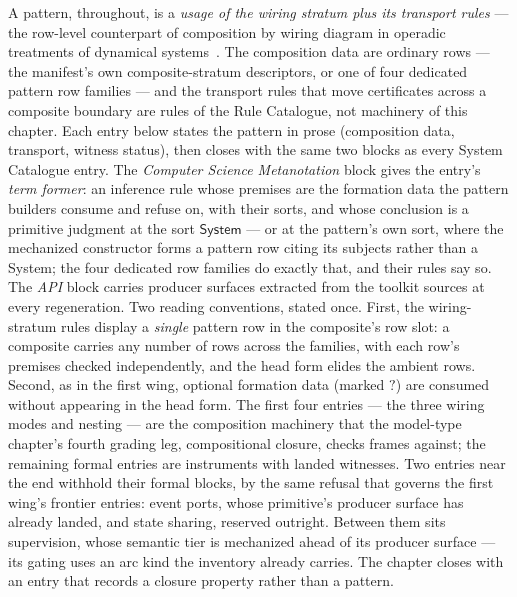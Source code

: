 A pattern, throughout, is a \emph{usage of the wiring stratum plus its
transport rules} --- the row-level counterpart of composition by
wiring diagram in operadic treatments of dynamical
systems~\cite{libkind21}. The composition data are ordinary rows --- the
manifest's own composite-stratum descriptors, or one of four dedicated
pattern row families --- and the transport rules that move
certificates across a composite boundary are rules of the Rule
Catalogue, not machinery of this chapter. Each entry below states the
pattern in prose (composition data, transport, witness status), then
closes with the same two blocks as every System Catalogue entry. The
\emph{Computer Science Metanotation} block gives the entry's \emph{term
former}: an inference rule whose premises are the formation data the
pattern builders consume and refuse on, with their sorts, and whose
conclusion is a primitive judgment at the sort $\mathsf{System}$ ---
or at the pattern's own sort, where the mechanized constructor
forms a pattern row citing its subjects rather than a System; the
four dedicated row families do exactly that, and their rules say so.
The \emph{API} block carries producer surfaces extracted from the
toolkit sources at every regeneration. Two reading conventions,
stated once. First, the wiring-stratum rules display a \emph{single}
pattern row in the composite's row slot: a composite carries any
number of rows across the families, with each row's premises checked
independently, and the head form elides the ambient rows. Second, as
in the first wing, optional formation data (marked $?$) are consumed
without appearing in the head form. The first four entries --- the
three wiring modes and nesting --- are the composition machinery that
the model-type chapter's fourth grading leg, compositional closure,
checks frames against; the remaining formal entries are instruments
with landed witnesses. Two entries near the end withhold their formal
blocks, by the same refusal that governs the first wing's frontier
entries: event ports, whose primitive's producer surface has already
landed, and state sharing, reserved outright. Between them sits
supervision, whose semantic tier is mechanized ahead of its producer
surface --- its gating uses an arc kind the inventory already
carries. The chapter closes with an entry that records a closure
property rather than a pattern.

